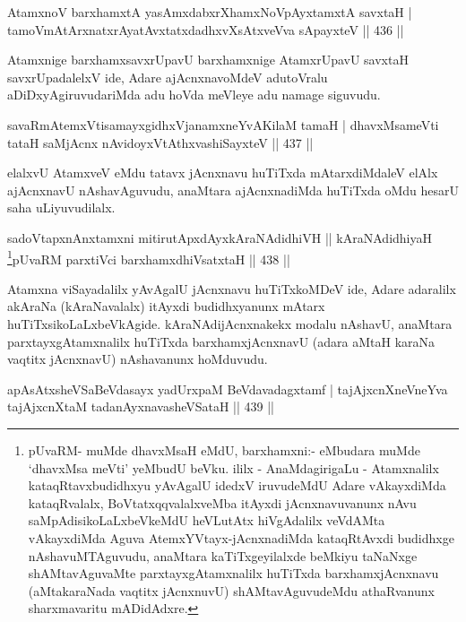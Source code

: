 \begin{shl}
AtamxnoV barxhamxtA yasAmxdabxrXhamxNoV\s pAyxtamxtA savxtaH |
tamoVmAtArxnatxrAyatAvxtatxdadhxvXsAtxveVva sA\s \s payxteV \hfill  || 436 ||
\end{shl}

\begin{artha}
Atamxnige barxhamxsavxrUpavU barxhamxnige AtamxrUpavU savxtaH savxrUpadalelxV ide, Adare ajAcnxnavoMdeV adutoVralu aDiDxyAgiruvudariMda adu hoVda meVleye adu namage siguvudu.
\end{artha}

\begin{shl}
savaRmAtemxVtisamayxgidhxVjanamxneYvAKilaM tamaH |
dhavxMsameVti tataH saMjAcnx nAvidoyxVtAthx\s vashiSayxteV \hfill  || 437 ||
\end{shl}

\begin{artha}
elalxvU AtamxveV eMdu tatavx jAcnxnavu huTiTxda mAtarxdiMdaleV elAlx ajAcnxnavU nAshavAguvudu, anaMtara ajAcnxnadiMda huTiTxda oMdu hesarU saha uLiyuvudilalx.
\end{artha}

\begin{shl}
sadoVtapxnAnx\s \s tamxni mitirutApxdAyx\s kAraNAdidhiVH ||
kAraNAdidhiyaH \footnote{pUvaRM- muMde dhavxMsaH eMdU, barxhamxni:- eMbudara muMde `dhavxMsa meVti' yeMbudU beVku. ililx - AnaMdagirigaLu - Atamxnalilx kataqRtavxbudidhxyu yAvAgalU idedxV iruvudeMdU Adare vAkayxdiMda kataqRvalalx, BoVtatxqqvalalxveMba itAyxdi jAcnxnavuvanunx nAvu saMpAdisikoLaLxbeVkeMdU heVLutAtx hiVgAdalilx veVdAMta vAkayxdiMda Aguva AtemxYVtayx-jAcnxnadiMda kataqRtAvxdi budidhxge nAshavuMTAguvudu, anaMtara kaTiTxgeyilalxde beMkiyu taNaNxge shAMtavAguvaMte parxtayxgAtamxnalilx huTiTxda barxhamxjAcnxnavu (aMtakaraNada vaqtitx jAcnxnuvU) shAMtavAguvudeMdu athaRvanunx sharxmavaritu mADidAdxre.}pUvaRM parxtiVci barxhamxdhiVsatxtaH \hfill  || 438 ||
\end{shl}


\begin{artha}
Atamxna viSayadalilx yAvAgalU jAcnxnavu huTiTxkoMDeV ide, Adare adaralilx akAraNa (kAraNavalalx) itAyxdi budidhxyanunx mAtarx huTiTxsikoLaLxbeVkAgide. kAraNAdijAcnxnakekx modalu nAshavU, anaMtara parxtayxgAtamxnalilx huTiTxda barxhamxjAcnxnavU (adara aMtaH karaNa vaqtitx jAcnxnavU) nAshavanunx hoMduvudu.
\end{artha}

\begin{shl}
apAsAtxsheVSaBeVdasayx yadUrxpaM BeVdavadagxtamf |
tajAjxcnXneVneYva tajAjxcnXtaM tadanAyxnavasheVSataH \hfill  || 439 ||
\end{shl}

